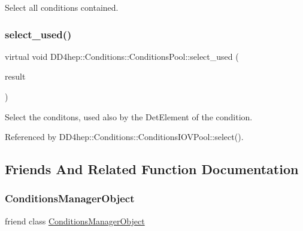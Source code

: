 Select all conditions contained. 

\hypertarget{class_d_d4hep_1_1_conditions_1_1_conditions_pool_aab6927d2d318a4f16b8704423c6cdd7a}{}\label{class_d_d4hep_1_1_conditions_1_1_conditions_pool_aab6927d2d318a4f16b8704423c6cdd7a} 
\subsubsection{\texorpdfstring{select\+\_\+used()}{select\_used()}}
{\footnotesize\ttfamily virtual void D\+D4hep\+::\+Conditions\+::\+Conditions\+Pool\+::select\+\_\+used (\begin{DoxyParamCaption}\item[{\hyperlink{namespace_d_d4hep_1_1_conditions_ae765f0140a33973a430280f02b6062f4}{Range\+Conditions} \&}]{result }\end{DoxyParamCaption})\hspace{0.3cm}{\ttfamily [pure virtual]}}



Select the conditons, used also by the Det\+Element of the condition. 



Referenced by D\+D4hep\+::\+Conditions\+::\+Conditions\+I\+O\+V\+Pool\+::select().



\subsection{Friends And Related Function Documentation}
\hypertarget{class_d_d4hep_1_1_conditions_1_1_conditions_pool_a8bc615a0a23a8207d3e5399c5066763e}{}\label{class_d_d4hep_1_1_conditions_1_1_conditions_pool_a8bc615a0a23a8207d3e5399c5066763e} 
\subsubsection{\texorpdfstring{Conditions\+Manager\+Object}{ConditionsManagerObject}}
{\footnotesize\ttfamily friend class \hyperlink{class_d_d4hep_1_1_conditions_1_1_conditions_manager_object}{Conditions\+Manager\+Object}\hspace{0.3cm}{\ttfamily [friend]}}



